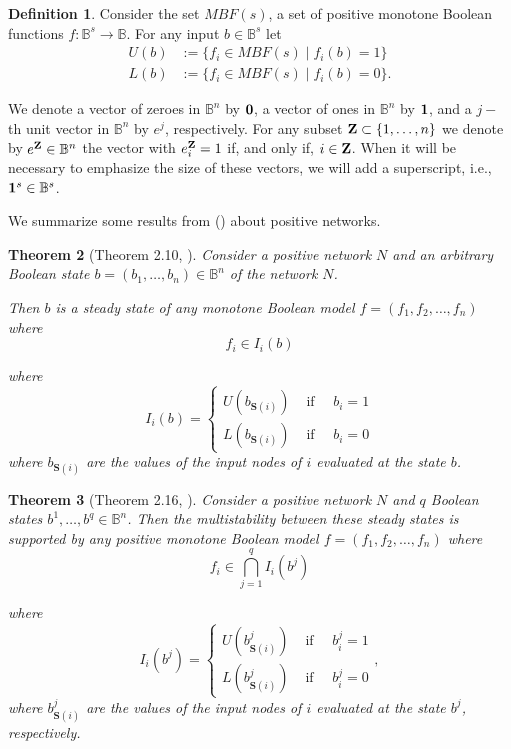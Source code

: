 \documentclass[12pt]{amsart}
\newcommand{\bZ}{{\bf Z}}
\newcommand{\bzero}{{\bf 0}}
\newcommand{\bone}{{\bf 1}}
\newcommand{\bbB}{\mathbb{B}}
\newcommand{\Sources}{\mathbf{S}}
\newtheorem{thm}{Theorem}[section]
\theoremstyle{definition}
\newtheorem{defn}[thm]{Definition}
\begin{document}
\begin{defn}\label{def:UL}
Consider the set $MBF(s)$, a set of positive monotone Boolean functions $f:\bbB^s\to \bbB$.
For any input $b\in \bbB^s$ let
\begin{align*}
    U(b) &:=\{ f_i \in MBF(s) \;|\; f_i(b) = 1\} \\
    L(b) &:=\{ f_i \in MBF(s) \;|\; f_i(b) = 0\}.
\end{align*}
\end{defn}

We denote a vector of zeroes in $\bbB^n$ by $\bzero$, a vector of ones in $\bbB^n$ by $\bone$, and a $j-$th unit vector in $\bbB^n$ by $e^j$, respectively. 
For any subset $\bZ\subset \{1,\ldots, n\}$ we denote by $e^{\bZ}\in \bbB^n$ the vector with $e^{\bZ}_i=1$ if, and only if, $i \in \bZ$.
When it will be necessary to emphasize the size of these vectors, we will add a superscript, i.e., $\bone^s\in \bbB^s$. 

We summarize some results from (\cite{adigwe_characterization_2026}) about positive networks.

\begin{thm}[Theorem 2.10, \cite{adigwe_characterization_2026}] \label{thm:monostability}
Consider a positive network $N$ and an arbitrary Boolean state $b=(b_1, \ldots, b_n)\in \bbB^n$ of the network $N$.

Then $b$ is a steady state of any monotone Boolean model $f=(f_1,f_2, \ldots, f_n)$ where
\[ f_i \in I_i(b)\]

where 
\[ I_i(b)= \left\{ \begin{array}{cc}
U(b_{\Sources(i)}) & \mbox{ if } \quad b_i=1\\
L(b_{\Sources(i)}) &\mbox{ if } \quad b_i=0
\end{array}
\right .
\]
where $b_{\Sources(i)}$ are the values of the input nodes of $i$ evaluated at the state $b$.
\end{thm}

\begin{thm}[Theorem 2.16, \cite{adigwe_characterization_2026}]\label{thm:multistability} \label{thm:multi_positive}
Consider a positive network $N$ and $q$ Boolean states $b^1,\ldots, b^q \in \bbB^n$.
Then the multistability between these steady states is supported by any positive monotone Boolean model $f=(f_1,f_2, \ldots, f_n)$ where
\[ f_i \in \bigcap_{j=1}^q I_i(b^j)\]

where 
\[ I_i(b^j)= \left\{ \begin{array}{cc}
U(b^j_{\Sources(i)}) & \mbox{ if } \quad b^j_i=1\\
L(b^j_{\Sources(i)}) &\mbox{ if } \quad b^j_i=0
\end{array}
\right . ,
\]
where $b^j_{\Sources(i)}$ are the values of the input nodes of $i$ evaluated at the state $b^j$, respectively.
\end{thm}
\end{document}
